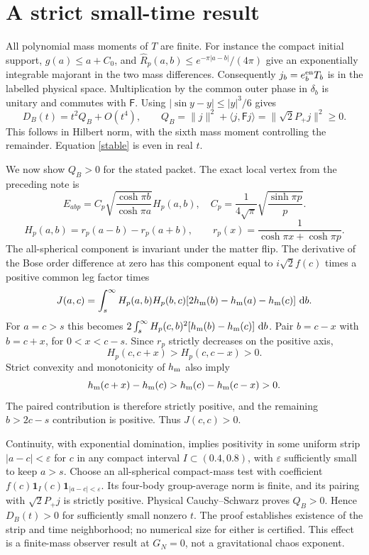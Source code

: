 \documentclass[11pt,a4paper]{article}
\newcommand{\dd}{\mathop{}\!\mathrm d}
\newcommand{\PP}{P_+}
\newcommand{\FF}{\mathsf F}
\newcommand{\hh}{h_{\rm m}}
\begin{document}
\section{A strict small-time result}
All polynomial mass moments of $T$ are finite. For instance the compact
initial support, $g(a)\le a+C_0$, and
$\widehat R_p(a,b)\le e^{-\pi|a-b|}/(4\pi)$
give an exponentially integrable majorant in the two mass differences.
Consequently $j_b=e_b^{\rm en}T_b$ is in the labelled physical space.
Multiplication by the common outer phase in $\delta_b$ is unitary and
commutes with $\FF$. Using
$|\sin y-y|\le |y|^3/6$ gives
\begin{equation}
 D_B(t)=t^2 Q_B+O(t^4),\qquad
 Q_B=\|j\|^2+\langle j,\FF j\rangle
     =\|\sqrt2\PP j\|^2\ge0 .
 \label{short}
\end{equation}
This follows in Hilbert norm, with the sixth mass moment controlling
the remainder. Equation \eqref{stable} is even in real $t$.

We now show $Q_B>0$ for the stated packet.
The exact local vertex from the preceding note is
\[
 E_{abp}=C_p\sqrt{\frac{\cosh\pi b}{\cosh\pi a}}H_p(a,b),\quad
 C_p=\frac1{4\sqrt\pi}\sqrt{\frac{\sinh\pi p}{p}}.
\]
\[
 H_p(a,b)=r_p(a-b)-r_p(a+b),\qquad
 r_p(x)=\frac1{\cosh\pi x+\cosh\pi p}.
\]
The all-spherical component is invariant under the matter flip.
The derivative of the Bose order difference at zero has this component
equal to $i\sqrt2 f(c)$ times a positive common leg factor times
\[
 J(a,c)=\int_s^\infty H_p(a,b)H_p(b,c)
           [2\hh(b)-\hh(a)-\hh(c)]\,\dd b .
\]
For $a=c>s$ this becomes
$2\int_s^\infty H_p(c,b)^2[\hh(b)-\hh(c)]\,\dd b$.
Pair $b=c-x$ with $b=c+x$, for $0<x<c-s$. Since $r_p$ strictly
decreases on the positive axis,
\[
 H_p(c,c+x)>H_p(c,c-x)>0 .
\]
Strict convexity and monotonicity of $\hh$ also imply
\[
 \hh(c+x)-\hh(c)>\hh(c)-\hh(c-x)>0 .
\]
The paired contribution is therefore strictly positive, and the
remaining $b>2c-s$ contribution is positive. Thus $J(c,c)>0$.

Continuity, with exponential domination, implies positivity in some
uniform strip $|a-c|<\varepsilon$ for $c$ in any compact interval
$I\subset(0.4,0.8)$, with $\varepsilon$ sufficiently small to keep
$a>s$. Choose an all-spherical compact-mass test with coefficient
$f(c)\mathbf1_I(c)\mathbf1_{|a-c|<\varepsilon}$.
Its four-body group-average norm is finite, and its pairing with
$\sqrt2\PP j$ is strictly positive.
Physical Cauchy--Schwarz proves $Q_B>0$.
Hence $D_B(t)>0$ for sufficiently small nonzero $t$.
The proof establishes existence of the strip and time neighborhood;
no numerical size for either is certified. This effect is a finite-mass
observer result at $G_N=0$, not a gravitational chaos exponent.
\end{document}

